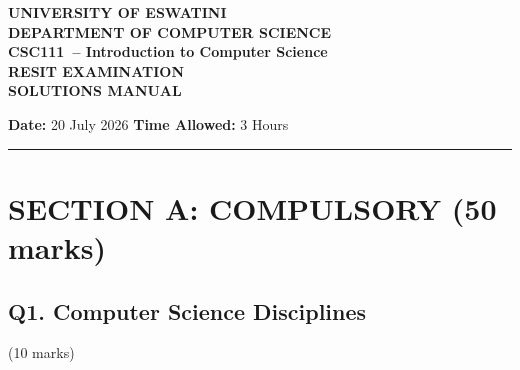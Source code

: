 \documentclass[12pt]{article}
\newcommand{\masunitnumber}{CSC111}
\newcommand{\coursename}{Introduction to Computer Science}
\begin{document}
\setlength{\headsep}{14truemm}
\setlength{\headheight}{14truemm}
\setlength{\voffset}{-0.4truein}
\renewcommand{\headrulewidth}{0.0pt}

\begin{center}
    \textbf{UNIVERSITY OF ESWATINI} \\
    \textbf{DEPARTMENT OF COMPUTER SCIENCE} \\
    \vspace{0.5cm}
    \textbf{\masunitnumber\ -- \coursename} \\
    \textbf{RESIT EXAMINATION} \\
    \vspace{0.5cm}
    \textbf{SOLUTIONS MANUAL}
\end{center}

\vspace{1cm}
\noindent\textbf{Date:} 20 July 2026 \hfill \textbf{Time Allowed:} 3 Hours

\vspace{1cm}
\hrule
\vspace{0.5cm}

\section*{SECTION A: COMPULSORY (50 marks)}

\subsection*{Q1. Computer Science Disciplines} \hfill (10 marks)
\end{document}

